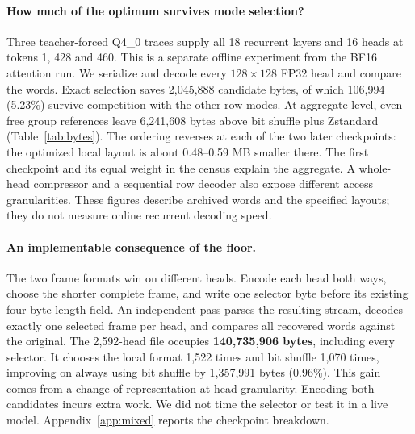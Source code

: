 \paragraph{How much of the optimum survives mode selection?}
Three teacher-forced Q4\_0 traces supply all 18 recurrent layers and 16 heads at tokens 1, 428 and 460. This is a separate offline experiment from the BF16 attention run. We serialize and decode every $128\times128$ FP32 head and compare the words. Exact selection saves 2,045,888 candidate bytes, of which 106,994 (5.23\%) survive competition with the other row modes. At aggregate level, even free group references leave 6,241,608 bytes above bit shuffle plus Zstandard (Table~\ref{tab:bytes}). The ordering reverses at each of the two later checkpoints: the optimized local layout is about 0.48--0.59 MB smaller there. The first checkpoint and its equal weight in the census explain the aggregate. A whole-head compressor and a sequential row decoder also expose different access granularities. These figures describe archived words and the specified layouts; they do not measure online recurrent decoding speed.

\paragraph{An implementable consequence of the floor.}
The two frame formats win on different heads. Encode each head both ways, choose the shorter complete frame, and write one selector byte before its existing four-byte length field. An independent pass parses the resulting stream, decodes exactly one selected frame per head, and compares all recovered words against the original. The 2,592-head file occupies \textbf{140,735,906 bytes}, including every selector. It chooses the local format 1,522 times and bit shuffle 1,070 times, improving on always using bit shuffle by 1,357,991 bytes (0.96\%). This gain comes from a change of representation at head granularity. Encoding both candidates incurs extra work. We did not time the selector or test it in a live model. Appendix~\ref{app:mixed} reports the checkpoint breakdown.

